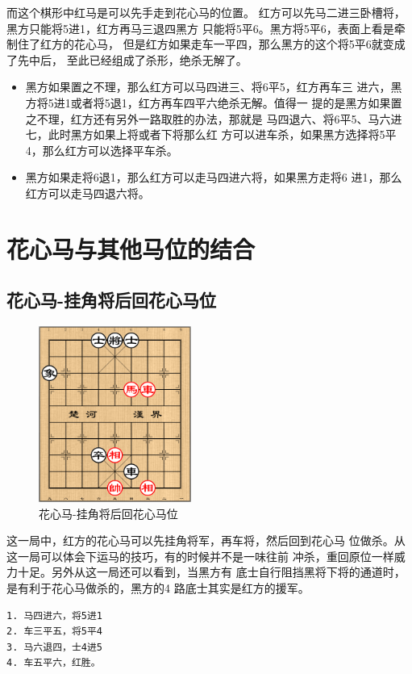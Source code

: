 \documentclass[a5paper,twoside]{book}
\begin{document}
而这个棋形中红马是可以先手走到花心马的位置。
红方可以先马二进三卧槽将，黑方只能将5进1，红方再马三退四黑方
只能将5平6。黑方将5平6，表面上看是牵制住了红方的花心马，
但是红方如果走车一平四，那么黑方的这个将5平6就变成了先中后，
至此已经组成了杀形，绝杀无解了。

\begin{itemize}
\item 黑方如果置之不理，那么红方可以马四进三、将6平5，红方再车三
进六，黑方将5进1或者将5退1，红方再车四平六绝杀无解。值得一
提的是黑方如果置之不理，红方还有另外一路取胜的办法，那就是
马四退六、将6平5、马六进七，此时黑方如果上将或者下将那么红
方可以进车杀，如果黑方选择将5平4，那么红方可以选择平车杀。
\item 黑方如果走将6退1，那么红方可以走马四进六将，如果黑方走将6
进1，那么红方可以走马四退六将。
\end{itemize}


\section{花心马与其他马位的结合}
\label{sec-5-5}
\subsection{花心马-挂角将后回花心马位}
\label{sec-5-5-1}
\begin{figure}[H]
\centering
\includegraphics[width=5cm]{pic/花心马-挂角将后回花心马位.png}
\caption{花心马-挂角将后回花心马位}
\end{figure}

这一局中，红方的花心马可以先挂角将军，再车将，然后回到花心马
位做杀。从这一局可以体会下运马的技巧，有的时候并不是一味往前
冲杀，重回原位一样威力十足。另外从这一局还可以看到，当黑方有
底士自行阻挡黑将下将的通道时，是有利于花心马做杀的，黑方的4
路底士其实是红方的援军。

\begin{verbatim}
1. 马四进六，将5进1
2. 车三平五，将5平4
3. 马六退四，士4进5
4. 车五平六，红胜。
\end{verbatim}
\end{document}
